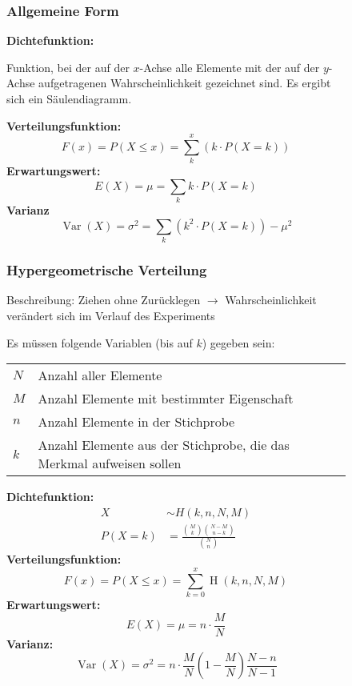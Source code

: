 \documentclass[12pt, a4paper, twoside]{scrreprt}
\begin{document}
\begin{figure}[H]
  \subsubsection{Allgemeine Form}
  \textbf{Dichtefunktion:}

  Funktion, bei der auf der \(x\)-Achse alle Elemente mit der auf der \(y\)-Achse aufgetragenen Wahrscheinlichkeit gezeichnet sind. Es ergibt sich ein Säulendiagramm.

  \textbf{Verteilungsfunktion:}
  \[F(x) = P(X \leq x) = \sum_k^x(k \cdot P(X=k))\]
  \textbf{Erwartungswert:}
  \[E(X) = \mu = \sum_k k \cdot P(X=k)\]
  \textbf{Varianz}
  \[\operatorname{Var}(X) = \sigma^2 = \sum_k {(k^2 \cdot P(X=k) )} - \mu^2\]
\end{figure}

\begin{figure}[H]
  \subsubsection{Hypergeometrische Verteilung}
Beschreibung: Ziehen ohne Zurücklegen $\rightarrow$ Wahrscheinlichkeit verändert sich im Verlauf des Experiments

  Es müssen folgende Variablen (bis auf \(k\)) gegeben sein:

  \begin{tabular}{ll}
    \toprule
    \(N\) & Anzahl aller Elemente\\
    \(M\) & Anzahl Elemente mit bestimmter Eigenschaft\\
    \(n\) & Anzahl Elemente in der Stichprobe\\
    \(k\) & Anzahl Elemente aus der Stichprobe, die das Merkmal aufweisen sollen\\
    \bottomrule
  \end{tabular}

  \textbf{Dichtefunktion:}
  \begin{align*}
    X &\sim H(k, n, N, M)\\[1em]
    P(X = k) &= \frac{\binom{M}{k}\binom{N-M}{n-k}}{\binom{N}{n}}
  \end{align*}
  \textbf{Verteilungsfunktion:}
  \[F(x) = P(X \leq x) = \sum_{k=0}^x\operatorname{H}(k,n,N,M)\]
  \textbf{Erwartungswert:}
  \[E(X) = \mu = n \cdot \frac{M}{N}\]
  \textbf{Varianz:}
  \[\operatorname{Var}(X) = \sigma^2 = n \cdot \frac{M}{N} \left(1 - \frac{M}{N}\right) \frac{N - n}{N - 1}\]
\end{figure}
\end{document}
